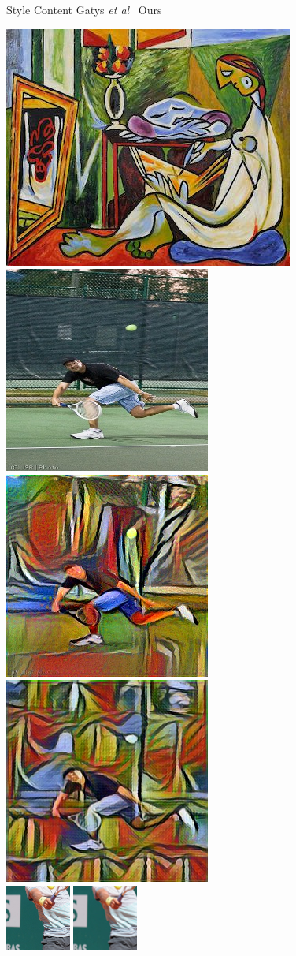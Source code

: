 \documentclass[runningheads]{llncs}
\newcommand{\etal}{\textit{et al}}
\begin{document}
\begin{figure}[t]
  \hspace{20mm} Style
  \hspace{15.5mm} Content
  \hspace{5.5mm} Gatys \etal~\cite{gatys2015neural}
  \hspace{6.5mm} Ours
  \vspace{-2.5mm}
  \begin{center}
    \includegraphics[height=0.19\textwidth]{la_muse_small.jpg}
    \includegraphics[height=0.19\textwidth]{906_orig.jpg}
    \includegraphics[height=0.19\textwidth]{906_baseline.jpg}
    \includegraphics[height=0.19\textwidth]{906_mine.jpg} \\
    \vspace{1mm}
    \includegraphics[width=0.19\textwidth]{3_orig.jpg}
    \includegraphics[width=0.19\textwidth]{3_bicubic.jpg}

\end{center}
\end{figure}
\end{document}
